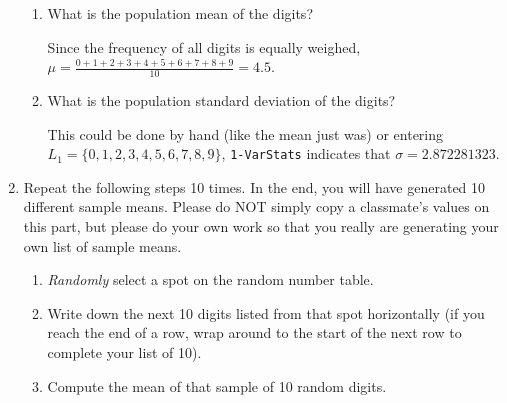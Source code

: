 \documentclass{article}
\newcommand{\answer}[1]{\color{white}#1}
\begin{document}
\begin{enumerate}
	\begin{enumerate}
	
	\item What is the population mean of the digits? 
	
	{\answer Since the frequency of all digits is equally weighed, $\mu = \frac{0+1+2+3+4+5+6+7+8+9}{10} = 4.5$.
	}
	
	\item What is the population standard deviation of the digits? 
	
	{\answer This could be done by hand (like the mean just was) or entering $L_1=\{0, 1, 2, 3, 4, 5, 6, 7, 8, 9\}$, \texttt{1-VarStats} indicates that $\sigma = 2.872281323$.
	} 
	\end{enumerate}
	
\item Repeat the following steps 10 times. In the end, you will have generated 10 different sample means. Please do NOT simply copy a classmate's values on this part, but please do your own work so that you really are generating your own list of sample means. 

	\begin{enumerate}
	
	\item {\em Randomly} select a spot on the random number table.
	
	\item Write down the next 10 digits listed from that spot horizontally (if you reach the end of a row, wrap around to the start of the next row to complete your list of 10). 
	
	\item Compute the mean of that sample of 10 random digits. 
	
	\end{enumerate}

\begin{center}	


\end{center}
\end{enumerate}
\end{document}
